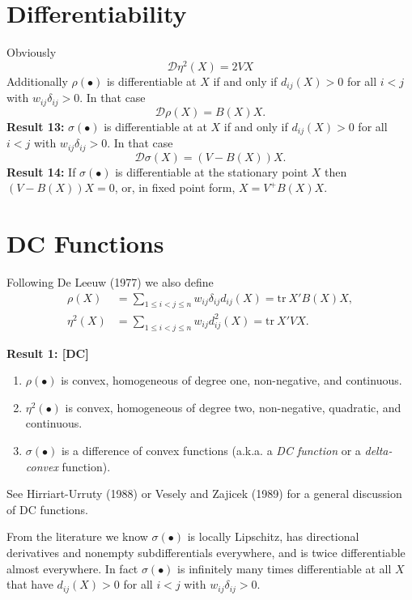 \documentclass[12pt,]{article}
\providecommand{\tightlist}{%
  \setlength{\itemsep}{0pt}\setlength{\parskip}{0pt}}
\begin{document}
\hypertarget{differentiability}{%
\section{Differentiability}\label{differentiability}}

Obviously \[
\mathcal{D}\eta^2(X)=2VX
\] Additionally \(\rho(\bullet)\) is differentiable at \(X\) if and only
if \(d_{ij}(X)>0\) for all \(i<j\) with \(w_{ij}\delta_{ij}>0\). In that
case \[
\mathcal{D}\rho(X)=B(X)X.
\] \textbf{Result 13: } \(\sigma(\bullet)\) is differentiable at at
\(X\) if and only if \(d_{ij}(X)>0\) for all \(i<j\) with
\(w_{ij}\delta_{ij}>0\). In that case \[
\mathcal{D}\sigma(X)=(V-B(X))X.
\] \textbf{Result 14: } If \(\sigma(\bullet)\) is differentiable at the
stationary point \(X\) then \((V-B(X))X=0\), or, in fixed point form,
\(X=V^+B(X)X\).

\hypertarget{dc-functions}{%
\section{DC Functions}\label{dc-functions}}

Following De Leeuw (1977) we also define \begin{align}
\rho(X)&=\mathop{\sum}_{1\leq i<j\leq n} w_{ij}\delta_{ij}d_{ij}(X)=\text{tr}\ X'B(X)X,\\
\eta^2(X)&=\mathop{\sum}_{1\leq i<j\leq n} w_{ij}d_{ij}^2(X)=\text{tr}\ X'VX.
\end{align}

\textbf{Result 1: {[}DC{]}}

\begin{enumerate}
\def\labelenumi{\arabic{enumi}.}
\tightlist
\item
  \(\rho(\bullet)\) is convex, homogeneous of degree one, non-negative,
  and continuous.
\item
  \(\eta^2(\bullet)\) is convex, homogeneous of degree two,
  non-negative, quadratic, and continuous.
\item
  \(\sigma(\bullet)\) is a difference of convex functions (a.k.a. a
  \emph{DC function} or a \emph{delta-convex} function).
\end{enumerate}

See Hirriart-Urruty (1988) or Vesely and Zajicek (1989) for a general
discussion of DC functions.

From the literature we know \(\sigma(\bullet)\) is locally Lipschitz,
has directional derivatives and nonempty subdifferentials everywhere,
and is twice differentiable almost everywhere. In fact
\(\sigma(\bullet)\) is infinitely many times differentiable at all \(X\)
that have \(d_{ij}(X)>0\) for all \(i<j\) with \(w_{ij}\delta_{ij}>0\).
\end{document}
